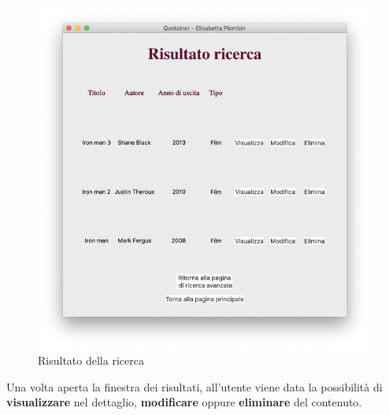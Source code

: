 \documentclass[a4paper,10pt]{article}
\begin{document}
\begin{figure}[H]
	\begin{center}
		\includegraphics[width=\textwidth,keepaspectratio]{immagini/RisultatoRicerca.png}
	\end{center}
	\caption{\label{fig:my-label} Risultato della ricerca}
\end{figure}
Una volta aperta la finestra dei risultati, all'utente viene data la possibilit\`a di \textbf{visualizzare} nel dettaglio, \textbf{modificare} oppure \textbf{eliminare} del contenuto.
\end{document}
